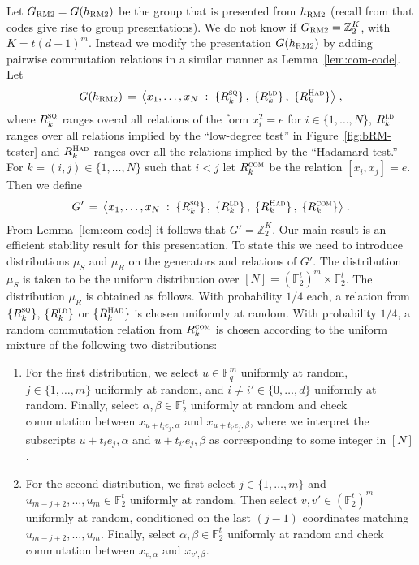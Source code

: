 \documentclass[11pt]{article}
\theoremstyle{definition}
\newcommand{\F}{\ensuremath{\mathbb{F}}}
\newcommand{\ld}{\textsc{ld}}
\newcommand{\com}{\textsc{com}}
\newcommand{\sq}{\textsc{sq}}
\newcommand{\Z}{\ensuremath{\mathbb{Z}}}
\newcommand{\bRM}{\ensuremath{\textsc{RM2}}}
\newcommand{\had}{\textsc{Had}}
\begin{document}
Let $G_\bRM = G(h_\bRM)$ be the group that is presented from $h_\bRM$ (recall from  that codes give rise to group presentations). We do not know if $G_\bRM = \Z_2^K$, with $K=t(d+1)^m$. Instead we modify the presentation $G(h_\bRM)$ by adding pairwise commutation relations in a similar manner as Lemma~\ref{lem:com-code}. Let 
\[ G(h_\bRM) \,=\, \big\langle x_1,\ldots,x_N \;:\; \{R^\sq_k\}\,,\; \{R^\ld_k\}\,,\; \{R^\had_{k}\} \big\rangle\;,\]
where  $R^\sq_k$ ranges overal all relations of the form $x_i^2=e$ for $i\in \{1,\ldots,N\}$, $R^\ld_k$ ranges over all relations implied by the ``low-degree test'' in Figure~\ref{fig:bRM-tester} and $R^\had_{k}$ ranges over all the relations implied by the ``Hadamard test.'' For $k=(i,j)\in\{1,\ldots,N\}$ such that $i<j$ let $R^\com_k$ be the relation $[x_i,x_j]=e$.
Then we define
\begin{equation}\label{eq:z2k-eff}
 G' \,=\,\big\langle x_1,\ldots,x_N \;:\; \{R^\sq_k\}\,,\; \{R^\ld_k\}\,,\; \{R^\had_{k}\}\, , \; \{ R^\com_k\}\big\rangle\;.
\end{equation}
From Lemma~\ref{lem:com-code} it follows that $G'=\Z_2^K$. Our main result is an efficient stability result for this presentation. To state this we need to introduce distributions $\mu_S$ and $\mu_R$ on the generators and relations of $G'$. The distribution $\mu_S$ is taken to be the uniform distribution over $[N] = (\F_2^t)^m \times \F_2^t$. The distribution $\mu_R$ is obtained as follows. With probability $1/4$ each, a relation from $\{R^\sq_k\}$, $\{R^\ld_k\}$ or $\{R^\had_k\}$ is chosen uniformly at random. With probability $1/4$, a random commutation relation from $R^\com_k$ is chosen according to the uniform mixture of the following two distributions:
\begin{enumerate}
\item For the first distribution, we select $u\in \F_q^m$ uniformly at random, $j\in\{1,\ldots,m\}$ uniformly at random, and $i\neq i'\in\{0,\ldots,d\}$ uniformly at random. Finally, select $\alpha,\beta\in \F_2^t$ uniformly at random and check commutation between $x_{u+t_i e_j,\alpha}$ and $x_{u+t_{i'} e_j,\beta}$,  where we interpret the subscripts  $u+t_i e_j,\alpha$ and $u+t_{i'} e_j,\beta$ as corresponding to some integer in $[N]$. 

\item For the second distribution, we first select $j\in\{1,\ldots,m\}$ and $u_{m-j+2},\ldots,u_m \in \F_2^t$ uniformly at random. Then select $v,v' \in (\F_2^t)^m$ uniformly at random, conditioned on the last $(j-1)$ coordinates matching $u_{m-j+2},\ldots,u_m$. Finally, select $\alpha,\beta\in \F_2^t$ uniformly at random and check commutation between $x_{v,\alpha}$ and $x_{v',\beta}$. 
\end{enumerate}
\end{document}
